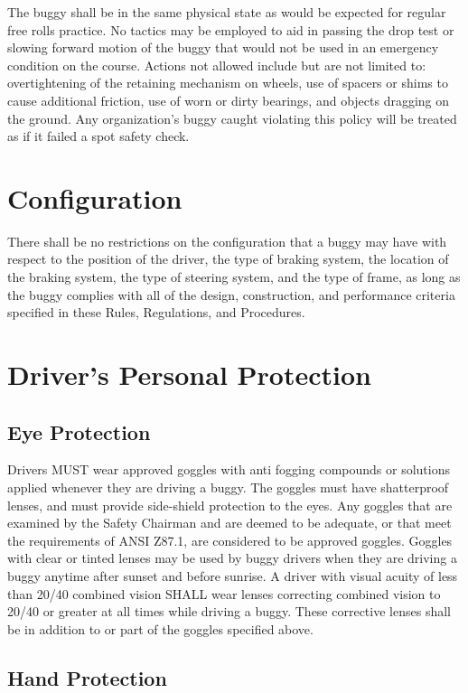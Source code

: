 The buggy shall be in the same physical state as would be expected for regular free rolls practice. No tactics may be employed to aid in passing the drop test or slowing forward motion of the buggy that would not be used in an emergency condition on the course. Actions not allowed include but are not limited to: overtightening of the retaining mechanism on wheels, use of spacers or shims to cause additional friction, use of worn or dirty bearings, and objects dragging on the ground. Any organization's buggy caught violating this policy will be treated as if it failed a spot safety check.


\section{Configuration}

	There shall be no restrictions on the configuration that a buggy may have with respect to the position of the driver, the type of braking system, the location of the braking system, the type of steering system, and the type of frame, as long as the buggy complies with all of the design, construction, and performance criteria specified in these Rules, Regulations, and Procedures.

\section{Driver's Personal Protection}

\subsection{Eye Protection}

	Drivers MUST wear approved goggles with anti fogging compounds or solutions applied whenever they are driving a buggy. The goggles must have shatterproof lenses, and must provide side-shield protection to the eyes. Any goggles that are examined by the Safety Chairman and are deemed to be adequate, or that meet the requirements of ANSI Z87.1, are considered to be approved goggles. Goggles with clear or tinted lenses may be used by buggy drivers when they are driving a buggy anytime after sunset and before sunrise. A driver with visual acuity of less than 20/40 combined vision SHALL wear lenses correcting combined vision to 20/40 or greater at all times while driving a buggy. These corrective lenses shall be in addition to or part of the goggles specified above.

\subsection{Hand Protection}

